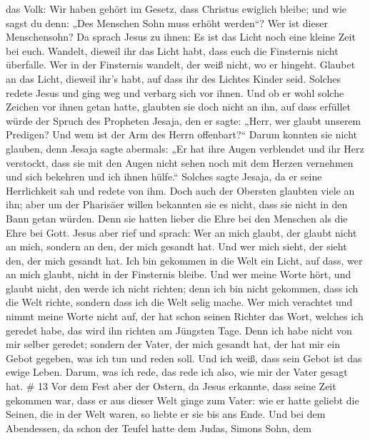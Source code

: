 das Volk: Wir haben gehört im Gesetz, dass Christus ewiglich bleibe; und
wie sagst du denn: „Des Menschen Sohn muss erhöht werden``? Wer ist
dieser Menschensohn?  Da sprach Jesus zu ihnen: Es ist das
Licht noch eine kleine Zeit bei euch. Wandelt, dieweil ihr das Licht
habt, dass euch die Finsternis nicht überfalle. Wer in der Finsternis
wandelt, der weiß nicht, wo er hingeht.  Glaubet an das
Licht, dieweil ihr's habt, auf dass ihr des Lichtes Kinder seid.
 Solches redete Jesus und ging weg und verbarg sich vor
ihnen. Und ob er wohl solche Zeichen vor ihnen getan hatte, glaubten sie
doch nicht an ihn,  auf dass erfüllet würde der Spruch des
Propheten Jesaja, den er sagte: „Herr, wer glaubt unserem Predigen? Und
wem ist der Arm des Herrn offenbart?{}``  Darum konnten sie
nicht glauben, denn Jesaja sagte abermals:  „Er hat ihre
Augen verblendet und ihr Herz verstockt, dass sie mit den Augen nicht
sehen noch mit dem Herzen vernehmen und sich bekehren und ich ihnen
hülfe.``  Solches sagte Jesaja, da er seine Herrlichkeit
sah und redete von ihm.  Doch auch der Obersten glaubten
viele an ihn; aber um der Pharisäer willen bekannten sie es nicht, dass
sie nicht in den Bann getan würden.  Denn sie hatten lieber
die Ehre bei den Menschen als die Ehre bei Gott.  Jesus
aber rief und sprach: Wer an mich glaubt, der glaubt nicht an mich,
sondern an den, der mich gesandt hat.  Und wer mich sieht,
der sieht den, der mich gesandt hat.  Ich bin gekommen in
die Welt ein Licht, auf dass, wer an mich glaubt, nicht in der
Finsternis bleibe.  Und wer meine Worte hört, und glaubt
nicht, den werde ich nicht richten; denn ich bin nicht gekommen, dass
ich die Welt richte, sondern dass ich die Welt selig mache.
 Wer mich verachtet und nimmt meine Worte nicht auf, der
hat schon seinen Richter das Wort, welches ich geredet habe, das wird
ihn richten am Jüngsten Tage.  Denn ich habe nicht von mir
selber geredet; sondern der Vater, der mich gesandt hat, der hat mir ein
Gebot gegeben, was ich tun und reden soll.  Und ich weiß,
dass sein Gebot ist das ewige Leben. Darum, was ich rede, das rede ich
also, wie mir der Vater gesagt hat. \# 13  Vor dem Fest aber
der Ostern, da Jesus erkannte, dass seine Zeit gekommen war, dass er aus
dieser Welt ginge zum Vater: wie er hatte geliebt die Seinen, die in der
Welt waren, so liebte er sie bis ans Ende.  Und bei dem
Abendessen, da schon der Teufel hatte dem Judas, Simons Sohn, dem
